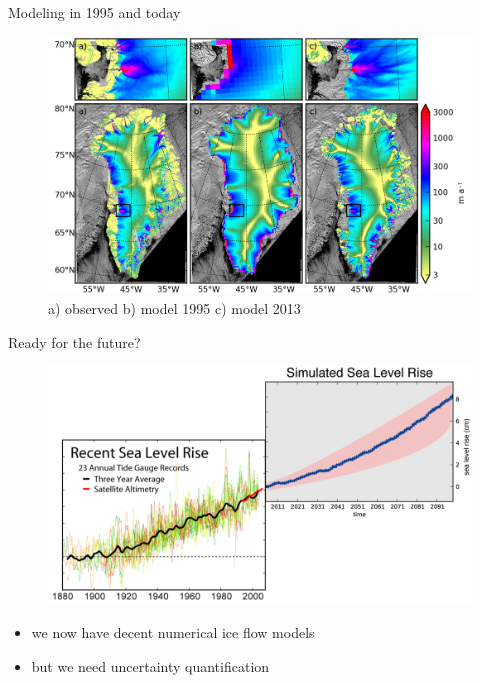 \documentclass[hide notes,intlimits]{beamer}
\begin{document}
\begin{frame}{Modeling in 1995 and today}
  \begin{figure}
    \includegraphics[width=\textwidth]{speed_sar_eismint_today}
    \\ \scriptsize{a) observed \qquad b) model 1995 \qquad c) model 2013}
  \end{figure}
\end{frame}




\begin{frame}{Ready for the future?}
  \begin{figure}
    \includegraphics[width=.85\textwidth]{sea_level_rise}
  \end{figure}
  \begin{itemize}
  \item we now have decent numerical ice flow models
  \item but we need uncertainty quantification
  \end{itemize}
\end{frame}
\end{document}
